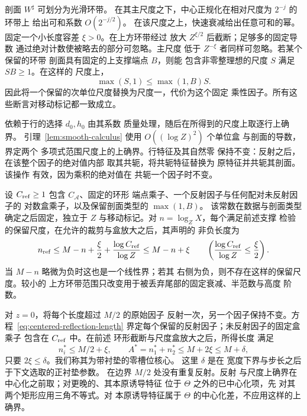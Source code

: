 剖面 \(W^\sharp\) 可划分为光滑环带。
在其主尺度之下，中心正规化在相对尺度为 \(2^{-j}\) 的环带上
给出可和系数 \(O(2^{-j/2})\)。
在该尺度之上，快速衰减给出任意可和的幂。
固定一个小长度容差 \(\xi>0\)。在上方环带经过
放大 \(Z^{\xi/2}\) 后截断；足够多的固定导数
通过绝对计数使被略去的部分可忽略。主尺度
低于 \(Z^{-\xi}\) 者同样可忽略。若某个保留的环带
剖面具有固定的上支撑端点 \(B\)，则能
包含非零整理想的尺度 \(S\) 满足 \(SB\ge1\)。在这样的
尺度上，
\[
 \max(S,1)\le\max(1,B)S.
\]
因此将一个保留的次单位尺度替换为尺度一，代价为这个固定
乘性因子。所有这些断言对移动标记都一致成立。

依赖于行的选择 \(d_0,h_0\) 由其系数
质量处理，随后在所得到的尺度上取逐行上确界。
引理~\ref{lem:smooth-calculus} 使用 \(O((\log Z)^2)\) 个单位盒
与剖面的导数，界定两个
多项式范围尺度上的上确界。行特征及其自然零
保持不变：反射之后，在该整个因子的绝对值内部
取其共轭，将共轭特征替换为
原特征并共轭其剖面。该操作
有效，因为乘积的绝对值在
共轭一个因子时不变。

设 \(C_{\rm ref}\ge1\) 包含 \(C_{\mathcal A}\)、固定的环形
端点乘子、一个反射因子与任何配对未反射因子的
对数盒乘子，以及保留剖面类型的 \(\max(1,B)\)。
该常数在数据与剖面类型确定之后固定，独立于
\(Z\) 与移动标记。对
\(n=\log_ZX\)，每个满足前述支撑
检验的保留尺度，在允许的裁剪与盒放大之后，其声明的
非负长度为
\begin{equation}
 n_{\rm ref}\le M-n+\frac\xi2+\frac{\log C_{\rm ref}}{\log Z}
 \le M-n+\xi
 \qquad\left(\frac{\log C_{\rm ref}}{\log Z}\le\frac\xi2\right).
 \label{eq:centered-reflection-length}
\end{equation}
当 \(M-n\) 略微为负时这也是一个线性界；若其
右侧为负，则不存在这样的保留尺度。较小的
上方环带范围只改变用于被丢弃尾部的固定衰减、半范数与高度
阶数。

对 \(z=0\)，将每个长度超过 \(M/2\) 的原始因子
反射一次，另一个因子保持不变。方程~\eqref{eq:centered-reflection-length}
界定每个保留的反射因子；未反射因子的固定盒乘子
包含在 \(C_{\rm ref}\) 中。在前述
环形截断与尺度盒放大之后，所得长度
满足
\begin{equation}
 n_i^*\le M/2+\xi,\qquad
 A^*=n_1^*+n_2^*\le M+2\xi\le M+\delta,
 \label{old-eq:2.1h}
\end{equation}
只要 \(2\xi\le\delta\)。我们称其为带衬垫的零槽位核心。
这里 \(\delta\) 是在
宽度下界与步长之后于下文选取的正衬垫参数。
在边界 \(M/2\) 处没有重复反射。反射
与尺度上确界在中心化之前取；对更晚的、其本原诱导特征
位于 \(\Theta\) 之外的已中心化项，先
对其两个矩形应用三角不等式。对
本原诱导特征属于 \(\Theta\) 的中心化差，不应用这样的上确界。

